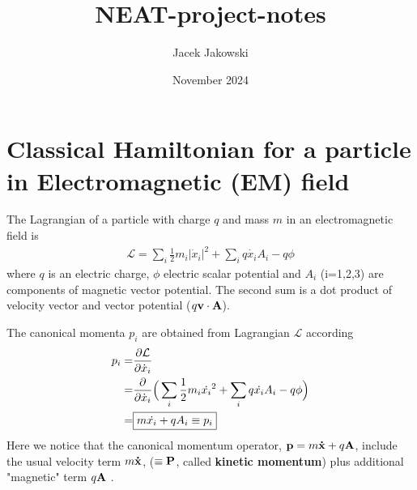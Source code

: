 \documentclass[11pt]{article}
\title{NEAT-project-notes}
\author{Jacek Jakowski}
\date{November 2024}
\begin{document}
\maketitle

\maketitle

\setcounter{tocdepth}{5}
\tableofcontents


\newpage
\section { Classical Hamiltonian for a particle in Electromagnetic (EM) field}
\label{sec:gauge_classical} 


The Lagrangian of a particle with charge $q$  and mass $m$ in an electromagnetic field
is
\begin{align*}
    \mathcal{ L } = \sum_i  \frac{1}{2}  m_i |\dot{ x}_i|^2 + \sum_i q \dot{ x_i} A_i -q \phi
\end{align*}
where $q$ is an electric charge, $\phi$ electric scalar potential and $A_i$ (i=1,2,3) are components of magnetic vector potential.  The second sum is a dot product of velocity vector and vector potential ($q\vb v \cdot \vb A$). 

The canonical momenta $p_i$  are  obtained from Lagrangian $\mathcal{L}$ according  
\begin{align}
    p_i = & \pdv{\mathcal{ L}}{ \dot{x}_i}  \nonumber \\
       = &  \pdv{\mathcal{ }}{ \dot{x}_i}  \Big(  \sum_i  \frac{1}{2}  m_i \dot{ x_i}^2 + \sum_i q \dot{x_i} A_i -q \phi  \Big) \nonumber \\
        = & \boxed{ m\dot{x_i} +q A_i \equiv p_i}
        \label{eq:p_canonical}
\end{align}
Here we notice that the canonical momentum operator, 
$\vb p =m  \vb{ \dot x} +q \vb A $,  include the usual velocity term $m \vb{ \dot x}$, ($\equiv \vb P$, called {\bf kinetic momentum}) plus additional "magnetic" term $q \vb A$ .   
\end{document}
